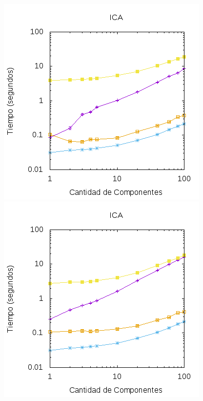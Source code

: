 \documentclass[10pt, a4paper]{article}
\begin{document}
\begin{figure}[H]
\includegraphics[scale=0.6]{../src/data/tmica.png}
\includegraphics[scale=0.6]{../src/data/tmpca.png}
\end{figure}
\end{document}
